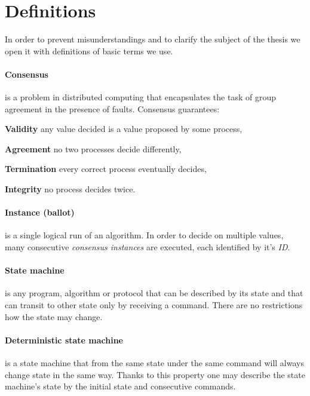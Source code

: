 \clearpage

\section{Definitions}

In order to prevent misunderstandings and to clarify the subject of the thesis we open it with definitions of
basic %
terms we use.


\paragraph{Consensus}
is a problem in distributed computing that encapsulates the task of group agreement in the presence of faults.
Consensus guarantees:

\begin{tightList}[\setlength{\leftmargin}{2\leftmargin}]
    \item[\textbf{Validity}] any value decided is a value proposed by some process,
    \item[\textbf{Agreement}] no two processes decide differently,
    \item[\textbf{Termination}] every correct process eventually decides,
    \item[\textbf{Integrity}] no process decides twice.
\end{tightList}

\paragraph{Instance (ballot)} is a single logical run of an algorithm. In order to decide on multiple values, many consecutive \textit{consensus instances} are executed, each identified by it's \textit{ID}.

\paragraph{State machine}
is any program, algorithm or protocol that can be described by its state and that can transit to other state only by receiving a command.
There are no restrictions how the state may change.

\paragraph{Deterministic state machine}
is a state machine that from the same state under the same command will always change state in the same way.
Thanks to this property one may describe the state machine's state by the initial state and consecutive commands. 

